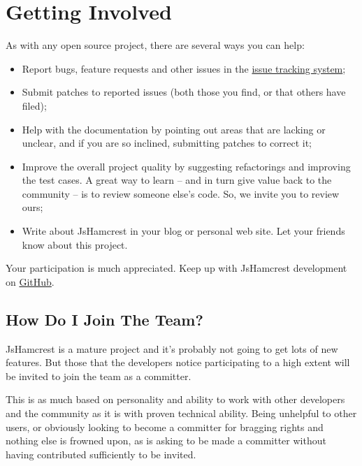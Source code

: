 \documentclass[letterpaper,10pt,english]{sphinxmanual}
\begin{document}
\section{Getting Involved}
\label{getting_involved:getting-involved}\label{getting_involved::doc}\label{getting_involved:yuitest}\label{getting_involved:id1}
As with any open source project, there are several ways you can help:
\begin{itemize}
\item {} 
Report bugs, feature requests and other issues in the
\href{http://github.com/danielfm/jshamcrest/issues}{issue tracking system};

\item {} 
Submit patches to reported issues (both those you find, or that others have
filed);

\item {} 
Help with the documentation by pointing out areas that are lacking or unclear,
and if you are so inclined, submitting patches to correct it;

\item {} 
Improve the overall project quality by suggesting refactorings and improving
the test cases. A great way to learn -- and in turn give value back to the
community -- is to review someone else's code. So, we invite you to review
ours;

\item {} 
Write about JsHamcrest in your blog or personal web site. Let your friends
know about this project.

\end{itemize}

Your participation is much appreciated. Keep up with JsHamcrest development on
\href{http://github.com/danielfm/jshamcrest/tree/master}{GitHub}.


\subsection{How Do I Join The Team?}
\label{getting_involved:how-do-i-join-the-team}
JsHamcrest is a mature project and it's probably not going to get lots of new
features. But those that the developers notice participating to a high extent
will be invited to join the team as a committer.

This is as much based on personality and ability to work with other developers
and the community as it is with proven technical ability. Being unhelpful to
other users, or obviously looking to become a committer for bragging rights and
nothing else is frowned upon, as is asking to be made a committer without having
contributed sufficiently to be invited.
\end{document}
